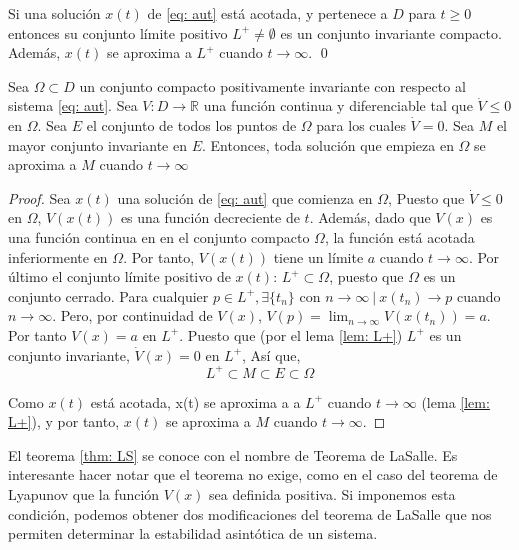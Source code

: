\begin{lemma}\label{lem: L+}
Si una solución $x(t)$ de \ref{eq: aut}  está acotada, y pertenece a $D$ para $t \geq 0$ entonces su conjunto límite positivo  $L^+ \neq \emptyset$ es un conjunto invariante compacto. Además, $x(t)$ se aproxima a $L^+$ cuando $t \to \infty$.
\qed
\end{lemma}

\begin{theorem}\label{thm: LS}
Sea $\Omega \subset D$ un conjunto compacto positivamente invariante  con respecto al sistema \ref{eq: aut}. Sea $V:D\to \mathbb{R}$ una función continua y diferenciable tal que $\dot V \leq 0$ en $\Omega$. Sea $E$ el conjunto de todos los puntos de $\Omega$ para los cuales $\dot V = 0$. Sea $M$ el mayor conjunto invariante en $E$. Entonces, toda solución que empieza en $\Omega$ se aproxima a $M$ cuando $t\to \infty$
\end{theorem}
\begin{proof}
Sea $x(t)$ una solución de \ref{eq: aut} que comienza en $\Omega$,  Puesto que $\dot V\leq 0$ en $\Omega$, $V(x(t))$ es una función decreciente de $t$. Además, dado que $V(x)$ es una función continua en en el conjunto compacto $\Omega$, la función está acotada inferiormente en $\Omega$. Por tanto,  $V(x(t))$ tiene un límite $a$ cuando $t\to \infty$. Por último el conjunto límite positivo de $x(t)$: $L^+ \subset \Omega$, puesto que $	\Omega$ es un conjunto cerrado.  Para cualquier $p \in L^+, \exists \{t_n\}$ con $n\to \infty \ | \ x(t_n)\to p$ cuando $n\to \infty$. Pero, por continuidad de $V(x)$, $V(p)= \lim_{n\to \infty }V(x(t_n))=a$. Por tanto $V(x)=a$ en $L^+$. Puesto que (por el lema \ref{lem: L+}) $L^+$ es un conjunto invariante, $\dot V(x) = 0$ en $L^+$, Así que,
\begin{equation*}
L^+ \subset M \subset E \subset \Omega 
\end{equation*} 

Como $x(t)$ está acotada, x(t) se aproxima a a $L^+$ cuando $t\to \infty$ (lema \ref{lem: L+}), y por tanto, $x(t)$ se aproxima a $M$ cuando $t\to \infty$. 
\end{proof}

El teorema \ref{thm: LS} se conoce con el nombre de Teorema de LaSalle. Es interesante hacer notar que el teorema no exige, como en el caso del teorema de Lyapunov que la función $V(x)$ sea definida positiva. Si imponemos esta condición, podemos obtener dos modificaciones del teorema de LaSalle que nos permiten determinar la estabilidad asintótica de un sistema.


